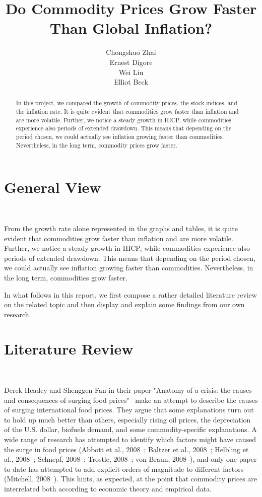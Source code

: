 \documentclass{article}
\title{\textbf{Do Commodity Prices Grow Faster Than Global Inflation?}}
\author{Chongshuo Zhai
\\Ernest Digore
\\Wei Liu
\\Elliot Beck}
\begin{document}
\maketitle

\begin{abstract}
In this project, we compared the growth of commodity prices, the stock indices, and the inflation rate. It is quite evident that commodities grow faster than inflation and are more volatile. Further, we notice a steady growth in HICP, while commodities experience also periods of extended drawdown. This means that depending on the period chosen, we could actually see inflation growing faster than commodities. Nevertheless, in the long term, commodity prices grow faster. 
\end{abstract}

\section{General View}

\

From the growth rate alone represented in the graphs and tables, it is quite evident that commodities grow faster than inflation and are more volatile. Further, we notice a steady growth in HICP, while commodities experience also periods of extended drawdown. This means that depending on the period chosen, we could actually see inflation growing faster than commodities. Nevertheless, in the long term, commodities grow faster. 

In what follows in this report, we first compose a rather detailed literature review on the related topic and then display and explain some findings from our own research.

\section{Literature Review}

\

Derek Headey and Shenggen Fan in their paper "Anatomy of a crisis: the causes and consequences of surging food prices"~\cite{headey2008anatomy} make an attempt to describe the causes of surging international food prices. They argue that some explanations turn out to hold up much better than others, especially rising oil prices, the depreciation of the U.S. dollar, biofuels demand, and some commodity-specific explanations. A wide range of research has attempted to identify which factors might have caused the surge in food prices (Abbott et al., 2008~\cite{abbott2008s}; Baltzer et al., 2008~\cite{baltzer2008measuring}; Helbling et al., 2008~\cite{helbling2008commodities}; Schnepf, 2008~\cite{schnepf2008high}; Trostle, 2008~\cite{trostle2008fluctuating}; von Braun, 2008~\cite{von2008rising}), and only one paper to date has attempted to add explicit orders of magnitude to different factors (Mitchell, 2008~\cite{mitchell2008note}). This hints, as expected, at the point that commodity prices are interrelated both according to economic theory and empirical data.  
\end{document}
